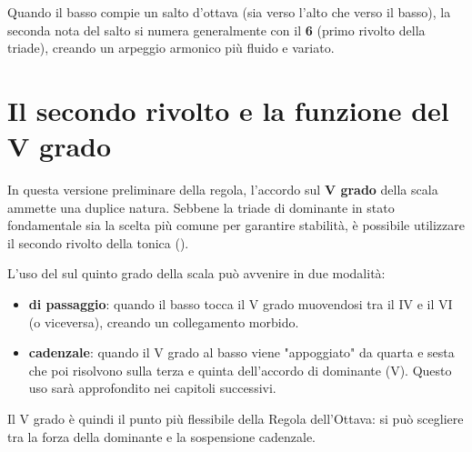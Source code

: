 \begin{regola}
	\label{reg:salto_ottava_basso}
	Quando il basso compie un salto d'ottava (sia verso l'alto che verso il basso), la seconda nota del salto si numera generalmente con il \textbf{6} (primo rivolto della triade), creando un arpeggio armonico più fluido e variato.
\end{regola}



\section{Il secondo rivolto e la funzione del V grado}
\label{sec:secondo_rivolto_regola}

In questa versione preliminare della regola, l'accordo sul \textbf{V grado} della scala ammette una duplice natura. Sebbene la triade di dominante in stato fondamentale sia la scelta più comune per garantire stabilità, è possibile utilizzare il secondo rivolto della tonica (\textbf{}).

L'uso del  sul quinto grado della scala può avvenire in due modalità:

\begin{itemize}
	\item \textbf{ di passaggio}: quando il basso tocca il V grado muovendosi tra il IV e il VI (o viceversa), creando un collegamento morbido.
	\item \textbf{ cadenzale}: quando il V grado al basso viene "appoggiato" da quarta e sesta che poi risolvono sulla terza e quinta dell'accordo di dominante (V). Questo uso sarà approfondito nei capitoli successivi.
\end{itemize}

Il V grado è quindi il punto più flessibile della Regola dell'Ottava: si può scegliere tra la forza della dominante e la sospensione cadenzale.


